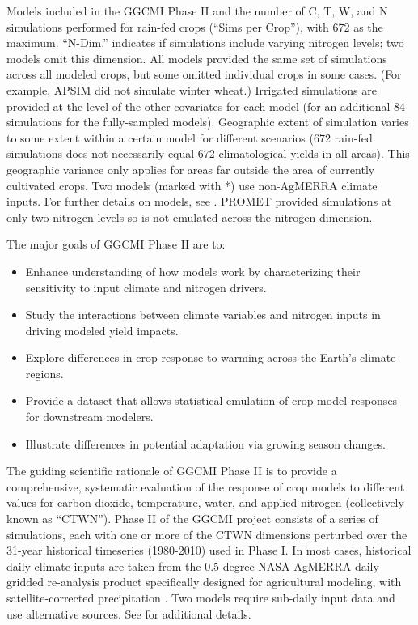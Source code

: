 \documentclass[preprint, 5p, times, twocolumn]{elsarticle}
\begin{document}
\begin{table}[!t]
 \caption{Models included in the GGCMI Phase II and the number of C, T, W, and N simulations performed for rain-fed crops (``Sims per Crop''), with 672 as the maximum. ``N-Dim.'' indicates if simulations include varying nitrogen levels; two models omit this dimension. All models provided the same set of simulations across all modeled crops, but some omitted individual crops in some cases. (For example, APSIM did not simulate winter wheat.) Irrigated simulations are provided at the level of the other covariates for each model (for an additional 84 simulations for the fully-sampled models). Geographic extent of simulation varies to some extent within a certain model for different scenarios (672 rain-fed simulations does not necessarily equal 672 climatological yields in all areas). This geographic variance only applies for areas far outside the area of currently cultivated crops. Two models (marked with *) use non-AgMERRA climate inputs. For further details on models, see \citet{Elliott2015}. \dag PROMET provided simulations at only two nitrogen levels so is not emulated across the nitrogen dimension.} 
\label{table:models}
\end{table}

The major goals of GGCMI Phase II are to:
\begin{itemize}
  \setlength\itemsep{0.3mm}
    \item Enhance understanding of how models work by characterizing their sensitivity to input climate and nitrogen drivers.
    \item Study the interactions between climate variables and nitrogen inputs in driving modeled yield impacts. 
    \item Explore differences in crop response to warming across the Earth's climate regions.
    \item Provide a dataset that allows statistical emulation of crop model responses for downstream modelers.
    \item Illustrate differences in potential adaptation via growing season changes. 
\end{itemize}

The guiding scientific rationale of GGCMI Phase II is to provide a comprehensive, systematic evaluation of the response of crop models to different values for carbon dioxide, temperature, water, and applied nitrogen (collectively known as ``CTWN''). Phase II of the GGCMI project consists of a series of simulations, each with one or more of the CTWN dimensions perturbed over the 31-year historical timeseries (1980-2010) used in Phase I. In most cases, historical daily climate inputs are taken from the 0.5 degree NASA AgMERRA daily gridded re-analysis product specifically designed for agricultural modeling, with satellite-corrected precipitation \citep{Ruane2015}. Two models require sub-daily input data and use alternative sources. See \citet{Elliott2015} for additional details. 
\end{document}

